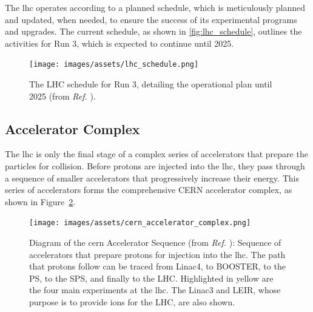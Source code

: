 The \acrshort{lhc} operates according to a planned schedule, which is meticulously planned and updated, when needed, to ensure the success of its experimental programs and upgrades. The current schedule, as shown in \autoref{fig:lhc_schedule}, outlines the activities for Run 3, which is expected to continue until 2025.


\begin{figure}[!htb]
    \centering
    \texttt{[image: images/assets/lhc\_schedule.png]}
    \caption[LHC Run 3 schedule]{The LHC schedule for Run 3, detailing the operational plan until 2025 (from \textit{Ref.} \cite{LHCSchedule}).}
    \label{fig:lhc_schedule}
\end{figure}

\subsection{Accelerator Complex}
\label{subsec:acc_complex}


The \acrshort{lhc} is only the final stage of a complex series of accelerators that prepare the particles for collision. Before protons are injected into the \acrshort{lhc}, they pass through a sequence of smaller accelerators that progressively increase their energy. This series of accelerators forms the comprehensive CERN accelerator complex, as shown in Figure~\ref{fig:cern_acc_complex}.

\begin{figure}[h]
	\centering
	\texttt{[image: images/assets/cern\_accelerator\_complex.png]}
	\caption[CERN Accelerator Sequence]{Diagram of the \acrshort{cern} Accelerator Sequence (from \textit{Ref.} \cite{cern-accelerator-complex}): Sequence of accelerators that prepare protons for injection into the \acrshort{lhc}. The path that protons follow can be traced from Linac4, to BOOSTER, to the PS, to the SPS, and finally to the LHC. Highlighted in yellow are the four main experiments at the \acrshort{lhc}. The Linac3 and LEIR, whose purpose is to provide ions for the LHC, are also shown.}
	\label{fig:cern_acc_complex}
\end{figure}

